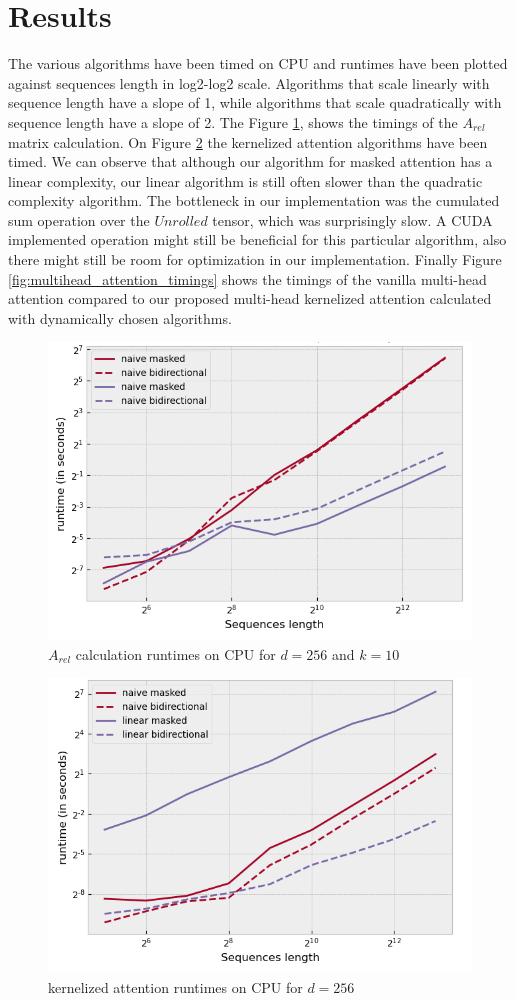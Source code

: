 \section{Results}

The various algorithms have been timed on CPU and runtimes have been plotted against sequences length in log2-log2 scale. Algorithms that scale linearly with sequence length have a slope of 1, while algorithms that scale quadratically with sequence length have a slope of 2. The Figure \ref{fig:RPE_timings}, shows the timings of the $A_{rel}$ matrix calculation. On Figure \ref{fig:kernelized_attention_timings} the kernelized attention algorithms have been timed. We can observe that although our algorithm for masked attention has a linear complexity, our linear algorithm is still often slower than the quadratic complexity algorithm. The bottleneck in our implementation was the cumulated sum operation over the $Unrolled$ tensor, which was surprisingly slow. A CUDA implemented operation might still be beneficial for this particular algorithm, also there might still be room for optimization in our implementation. Finally Figure \ref{fig:multihead_attention_timings} shows the timings of the vanilla multi-head attention compared to our proposed multi-head kernelized attention calculated with dynamically chosen algorithms.

\begin{figure}
	\center
	\includegraphics[width=0.7\linewidth]{images/runtimes_RPE.png}
	\caption{$A_{rel}$ calculation runtimes on CPU for $d=256$ and $k=10$}
	\label{fig:RPE_timings}
\end{figure}

\begin{figure}
	\center
	\includegraphics[width=0.7\linewidth]{images/runtimes_KA.png}
	\caption{kernelized attention runtimes on CPU for $d=256$}
	\label{fig:kernelized_attention_timings}
\end{figure}


